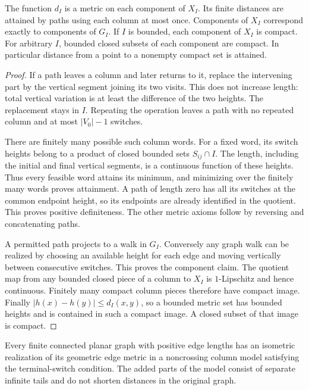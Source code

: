 \begin{lemma}\label{geo:geodesics}
The function $d_I$ is a metric on each component of $X_I$.  Its finite
distances are attained by paths using each column at most once.  Components
of $X_I$ correspond exactly to components of $G_I$.  If $I$ is bounded, each
component of $X_I$ is compact.  For arbitrary $I$, bounded closed subsets of
each component are compact.  In particular distance from a point to a
nonempty compact set is attained.
\end{lemma}

\begin{proof}
If a path leaves a column and later returns to it, replace the intervening
part by the vertical segment joining its two visits.  This does not increase
length: total vertical variation is at least the difference of the two
heights.  The replacement stays in $I$.  Repeating the operation leaves
a path with no repeated column and at most $|V_0|-1$ switches.

There are finitely many possible such column words.  For a fixed word, its
switch heights belong to a product of closed bounded sets $S_{ij}\cap I$.
The length, including the initial and final vertical segments, is a
continuous function of these heights.  Thus every feasible word attains
its minimum, and minimizing over the finitely many words proves attainment.
A path of length zero has all its switches at the common endpoint height,
so its endpoints are already identified in the quotient.  This proves
positive definiteness.  The other metric axioms follow by reversing and
concatenating paths.

A permitted path projects to a walk in $G_I$.  Conversely any graph walk
can be realized by choosing an available height for each edge and moving
vertically between consecutive switches.  This proves the component claim.
The quotient map from any bounded closed piece of a column to $X_I$ is
$1$-Lipschitz and hence continuous.  Finitely many compact column pieces
therefore have compact image.  Finally $|h(x)-h(y)|\le d_I(x,y)$, so a bounded
metric set has bounded heights and is contained in such a compact image.
A closed subset of that image is compact.
\end{proof}

\begin{proposition}\label{geo:realization}
Every finite connected planar graph with positive edge lengths has an
isometric realization of its geometric edge metric in a noncrossing column
model satisfying the terminal-switch condition.  The added parts of the
model consist of separate infinite tails and do not shorten distances in
the original graph.
\end{proposition}

